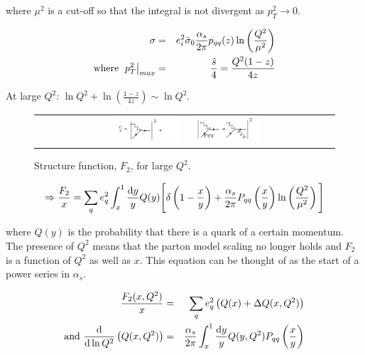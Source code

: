 where $\mu^2$ is a cut-off so that the integral is not divergent as $p_T^2 \to 0$.

\begin{eqnarray*}
  \sigma & = & e_i^2\hat{\sigma}_0\frac{\alpha_s}{2\pi}p_{qq}(z)\ln\left(\frac{Q^2}{\mu^2}\right) \\
\textrm{where  }\left.p_T^2\right|_{max} & = & \frac{\hat{s}}{4} = \frac{Q^2(1 - z)}{4z}
\end{eqnarray*}

At large $Q^2$: $\ln Q^2 + \ln\left(\frac{1-z}{4z}\right) \sim \ln Q^2$.

\begin{figure}[!htb]
  \begin{center}
    \begin{tabular}{rl}
      \includegraphics[width=0.5\textwidth]{images/web_feynman/image_73a.png} &
      \includegraphics[width=0.5\textwidth]{images/web_feynman/image_73b.png}
    \end{tabular}
    \caption[Structure function for large $Q^2$]{Structure function, $F_2$, for large $Q^2$.}
    \label{fig:ch14_F2}
  \end{center}
\end{figure}

\[
  \Rightarrow \frac{F_2}{x} = \sum_q e_q^2 \int_x^1 \frac{\mathrm{d}y}{y}Q(y)\Bigg[ \delta\left(1 - \frac{x}{y}\right) + \frac{\alpha_s}{2\pi}P_{qq}\left(\frac{x}{y}\right)\ln\left(\frac{Q^2}{\mu^2}\right)\Bigg]
\]

where $Q(y)$ is the probability that there is a quark of a certain momentum.  The presence of $Q^2$ means that the parton model scaling no longer holds and $F_2$ is a function of $Q^2$ as well as $x$.  This equation can be thought of as the start of a power series in $\alpha_s$.

\begin{eqnarray*}
  \frac{F_2(x,Q^2)}{x} & = & \sum_q e_q^2 \left(Q(x) + \Delta Q(x,Q^2)\right) \\
  \textrm{and } \frac{\mathrm{d}}{\mathrm{d}\ln Q^2}\left(Q(x,Q^2)\right) & = & \frac{\alpha_s}{2\pi}\int_x^1\frac{\mathrm{d}y}{y}Q(y,Q^2)P_{qq}\left(\frac{x}{y}\right)
\end{eqnarray*}

